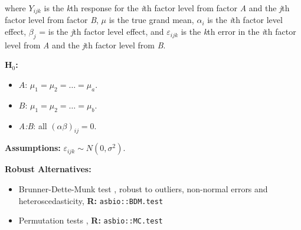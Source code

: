 \documentclass[12pt,english]{article}\usepackage[]{graphicx}\usepackage[table]{xcolor}
\begin{document}
\noindent where $Y_{ijk}$ is the \textit{k}th response for the \textit{i}th factor level from factor \textit{A} and the \textit{j}th factor level from factor \textit{B}, $\mu$ is the true grand mean, $\alpha_i$ is the \textit{i}th factor level effect, $\beta_j$ = is the \textit{j}th factor level effect, and $\varepsilon_{ijk}$ is the \textit{k}th error in the \textit{i}th factor level from \textit{A} and the \textit{j}th factor level from \textit{B}. \\
\vspace{0.05in}

\noindent \textbf{H$_0$:}
\begin{itemize}
\item $A$: $\mu_1 = \mu_2 = \dots = \mu_a$.
\item $B$: $\mu_1 = \mu_2 = \dots = \mu_b$.
\item \textit{A:B}: all $(\alpha\beta)_{ij} = 0$.
\end{itemize}
\vspace{0.1in}

\noindent \textbf{Assumptions:} $\varepsilon_{ijk} \sim N(0, \sigma^2)$.
\vspace{0.1in}

\noindent \textbf{Robust Alternatives:}
\begin{small}
\begin{itemize}
\item Brunner-Dette-Munk test \citep{brunner1997}, robust to outliers, non-normal errors and heteroscedasticity, \textbf{R:} \texttt{asbio::BDM.test}\vspace{-.1in}
\item Permutation tests \citep[see][]{manly2006}, \textbf{R:} \texttt{asbio::MC.test}
\end{itemize}
\end{small}
\vspace{0.1in}
\end{document}
